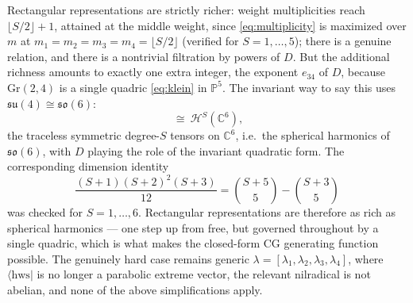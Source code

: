 \documentclass[12pt]{article}
\newcommand{\hws}{\mathrm{hws}}
\newcommand{\so}{\mathfrak{so}}
\newcommand{\su}{\mathfrak{su}}
\newcommand{\Gr}{\mathrm{Gr}}
\begin{document}
Rectangular representations are strictly richer: weight multiplicities reach
$\lfloor S/2\rfloor+1$, attained at the middle weight, since
\eqref{eq:multiplicity} is maximized over $m$ at $m_1=m_2=m_3=m_4=\lfloor
S/2\rfloor$ (verified for $S=1,\dots,5$); there is a genuine relation, and there is a
nontrivial filtration by powers of $D$. But the additional richness amounts to
exactly one extra integer, the exponent $e_{34}$ of $D$, because $\Gr(2,4)$ is a
single quadric \eqref{eq:klein} in $\mathbb{P}^5$. The invariant way to say this
uses $\su(4)\cong\so(6)$:
\begin{equation}
[S,S,0,0]\ \cong\ \mathcal{H}^S(\mathbb{C}^6),
\end{equation}
the traceless symmetric degree-$S$ tensors on $\mathbb{C}^6$, i.e.\ the spherical
harmonics of $\so(6)$, with $D$ playing the role of the invariant quadratic form.
The corresponding dimension identity
\begin{equation}
\frac{(S+1)(S+2)^2(S+3)}{12}=\binom{S+5}{5}-\binom{S+3}{5}
\end{equation}
was checked for $S=1,\dots,6$. Rectangular representations are therefore as rich
as spherical harmonics --- one step up from free, but governed throughout by a
single quadric, which is what makes the closed-form CG generating function
possible. The genuinely hard case remains generic
$\lambda=[\lambda_1,\lambda_2,\lambda_3,\lambda_4]$, where $\langle\hws|$ is no
longer a parabolic extreme vector, the relevant nilradical is not abelian, and
none of the above simplifications apply.



\end{document}
